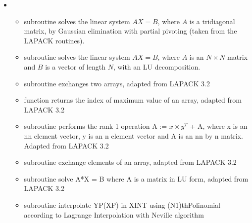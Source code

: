 \documentclass[letterpaper,10pt,english]{sphinxmanual}
\begin{document}
\begin{itemize}
\begin{itemize}
\item {} 
\sphinxAtStartPar
subroutine  \sphinxhyphen{} used by the root\sphinxhyphen{}finding subroutine to derive the central pressure given
the central density.


\end{itemize}

\item {} 
\sphinxAtStartPar
{}
\begin{itemize}
\item {} 
\sphinxAtStartPar
subroutine  \sphinxhyphen{} solves the linear system \(AX = B\), where \(A\) is a tridiagonal matrix, by
Gaussian elimination with partial pivoting (taken from the LAPACK routines).

\item {} 
\sphinxAtStartPar
subroutine  \sphinxhyphen{} solves the linear system \(AX = B\), where \(A\) is an \(N \times N\) matrix and \(B\) is a vector of length \(N\), with an LU decomposition.

\item {} 
\sphinxAtStartPar
subroutine  \sphinxhyphen{} exchanges two arrays, adapted from LAPACK 3.2

\item {} 
\sphinxAtStartPar
function  \sphinxhyphen{} returns the index of maximum value of an array, adapted from LAPACK 3.2

\item {} 
\sphinxAtStartPar
subroutine  \sphinxhyphen{} performs the rank 1 operation A := \(x \times y^T\) + A, where  x is an nn element vector, y is an n element vector and A is an nn by n matrix. Adapted from LAPACK 3.2

\item {} 
\sphinxAtStartPar
subroutine  \sphinxhyphen{} exchange elements of an array,  adapted from LAPACK 3.2

\item {} 
\sphinxAtStartPar
subroutine  solve A*X = B where A is a matrix in LU form, adapted from LAPACK 3.2

\item {} 
\sphinxAtStartPar
subroutine  \sphinxhyphen{} interpolate YP(XP) in XINT using (N\sphinxhyphen{}1)th\sphinxhyphen{}Polinomial according to Lagrange Interpolation with Neville algorithm


\end{itemize}
\end{itemize}
\end{document}
